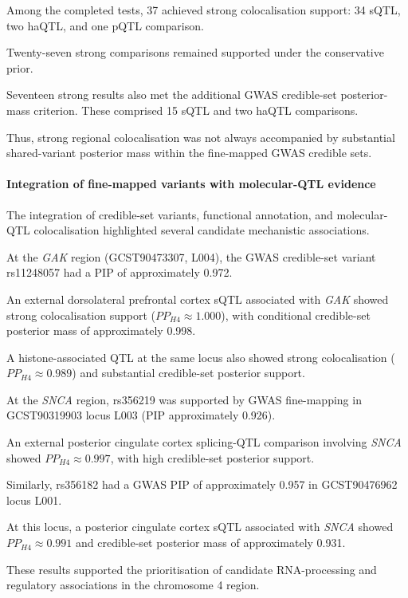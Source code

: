 \documentclass[11pt,a4paper]{article}
\begin{document}
Among the completed tests, 37 achieved
strong colocalisation support:
34 sQTL, two haQTL, and one pQTL comparison.

Twenty-seven strong comparisons remained
supported under the conservative prior.

Seventeen strong results also met the
additional GWAS credible-set posterior-mass
criterion. These comprised 15 sQTL and
two haQTL comparisons.

Thus, strong regional colocalisation
was not always accompanied by substantial
shared-variant posterior mass within
the fine-mapped GWAS credible sets.


\paragraph{Integration of fine-mapped variants
with molecular-QTL evidence}

The integration of credible-set variants,
functional annotation, and molecular-QTL
colocalisation highlighted several
candidate mechanistic associations.

At the \textit{GAK} region
(GCST90473307, L004), the GWAS
credible-set variant rs11248057
had a PIP of approximately 0.972.

An external dorsolateral prefrontal cortex
sQTL associated with \textit{GAK}
showed strong colocalisation support
($PP_{H4}\approx1.000$), with conditional
credible-set posterior mass of approximately
0.998.

A histone-associated QTL at the same
locus also showed strong colocalisation
($PP_{H4}\approx0.989$) and substantial
credible-set posterior support.

At the \textit{SNCA} region,
rs356219 was supported by GWAS
fine-mapping in GCST90319903 locus L003
(PIP approximately 0.926).

An external posterior cingulate cortex
splicing-QTL comparison involving
\textit{SNCA} showed
$PP_{H4}\approx0.997$, with high
credible-set posterior support.

Similarly, rs356182 had a GWAS PIP
of approximately 0.957 in
GCST90476962 locus L001.

At this locus, a posterior cingulate cortex
sQTL associated with \textit{SNCA}
showed $PP_{H4}\approx0.991$
and credible-set posterior mass
of approximately 0.931.

These results supported the prioritisation
of candidate RNA-processing and regulatory
associations in the chromosome 4 region.
\end{document}
